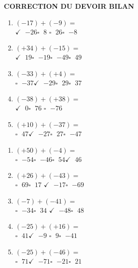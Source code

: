 \documentclass[11pt]{article}
\begin{document}
\begin{center}
\textbf{CORRECTION DU DEVOIR BILAN}
\end{center}

\begin{center}
\brouillon
\soin
{}
\end{center}

\begin{multicols}{2}
\begin{exercicedevoir}[5][QCM]
\begin{enumerate}[itemsep=0.5em]
\item $ (-17) + (-9) =$ \\ $\checkmark\;$ $-26$\qquad $\square\;$ $8$\qquad
$\square\;$ $26$\qquad $\square\;$ $-8$\qquad
\item $ (+34) + (-15) =$ \\ $\checkmark\;$ $19$\qquad $\square\;$
$-19$\qquad $\square\;$ $-49$\qquad $\square\;$ $49$\qquad
\item $ (-33) + (+4) =$ \\ $\square\;$ $-37$\qquad $\checkmark\;$
$-29$\qquad $\square\;$ $29$\qquad $\square\;$ $37$\qquad
\item $ (-38) + (+38) =$ \\ $\checkmark\;$ $0$\qquad $\square\;$ $76$\qquad
$\square\;$ $-76$\qquad
\item $ (+10) + (-37) =$ \\ $\square\;$ $47$\qquad $\checkmark\;$
$-27$\qquad $\square\;$ $27$\qquad $\square\;$ $-47$\qquad
\end{enumerate}
\end{exercicedevoir}

\begin{exercicedevoir}[5][QCM]
\begin{enumerate}[itemsep=0.5em]
\item $ (+50) + (-4) =$ \\ $\square\;$ $-54$\qquad $\square\;$
$-46$\qquad $\square\;$ $54$\qquad $\checkmark\;$ $46$\qquad
\item $ (+26) + (-43) =$ \\ $\square\;$ $69$\qquad $\square\;$ $17$\qquad
$\checkmark\;$ $-17$\qquad $\square\;$ $-69$\qquad
\item $ (-7) + (-41) =$ \\ $\square\;$ $-34$\qquad $\square\;$ $34$\qquad
$\checkmark\;$ $-48$\qquad $\square\;$ $48$\qquad
\item $ (-25) + (+16) =$ \\ $\square\;$ $41$\qquad $\checkmark\;$ $-9$\qquad
$\square\;$ $9$\qquad $\square\;$ $-41$\qquad
\item $ (-25) + (-46) =$ \\ $\square\;$ $71$\qquad $\checkmark\;$
$-71$\qquad $\square\;$ $-21$\qquad $\square\;$ $21$\qquad
\end{enumerate}
\end{exercicedevoir}


\end{multicols}
\end{document}
